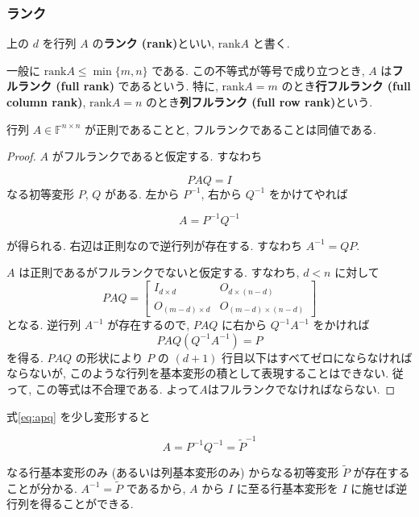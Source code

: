 \documentclass[a4paper]{scrbook}
\theoremstyle{definition}
\let\BeginKnitrBlock\begin \let\EndKnitrBlock\end
\begin{document}
\subsubsection*{ランク}

上の \(d\) を行列 \(A\) の\textbf{ランク (rank)}といい,
\(\mathrm{rank}A\) と書く.

一般に \(\mathrm{rank}A\le\min\{m,n\}\) である.
この不等式が等号で成り立つとき, \(A\) は\textbf{フルランク (full rank)}
であるという. 特に, \(\mathrm{rank}A=m\) のとき\textbf{行フルランク
(full column rank)}, \(\mathrm{rank}A=n\) のとき\textbf{列フルランク
(full row rank)}という.

\BeginKnitrBlock{proposition}
\protect\hypertarget{prp:unnamed-chunk-50}{}{\label{prp:unnamed-chunk-50}}行列
\(A\in\mathbb{F}^{n\times n}\) が正則であることと,
フルランクであることは同値である.
\EndKnitrBlock{proposition}

\BeginKnitrBlock{proof}
\iffalse {証明. } \fi \(A\) がフルランクであると仮定する. すなわち

\[
  PAQ=I
\] なる初等変形 \(P\), \(Q\) がある. 左から \(P^{-1}\), 右から
\(Q^{-1}\) をかけてやれば

\begin{equation}
  A = P^{-1}Q^{-1} \label{eq:apq}
\end{equation}

が得られる. 右辺は正則なので逆行列が存在する. すなわち \(A^{-1}=QP\).

\(A\) は正則であるがフルランクでないと仮定する. すなわち, \(d<n\)
に対して \[
  PAQ=\left[\begin{array}{c|c}
  I_{d\times d} & O_{d\times(n-d)}\\
  \hline O_{(m-d)\times d} & O_{(m-d)\times(n-d)}
  \end{array}\right]
\] となる. 逆行列 \(A^{-1}\) が存在するので, \(PAQ\) に右から
\(Q^{-1}A^{-1}\) をかければ \[ 
PAQ(Q^{-1}A^{-1})=P
\] を得る. \(PAQ\) の形状により \(P\) の \((d+1)\)
行目以下はすべてゼロにならなければならないが,
このような行列を基本変形の積として表現することはできない. 従って,
この等式は不合理である. よって\(A\)はフルランクでなければならない.
\EndKnitrBlock{proof}

式\eqref{eq:apq} を少し変形すると

\[
A=P^{-1}Q^{-1}=\tilde{P}^{-1}
\]

なる行基本変形のみ (あるいは列基本変形のみ) からなる初等変形
\(\tilde{P}\) が存在することが分かる. \(A^{-1}=\tilde{P}\) であるから,
\(A\) から \(I\) に至る行基本変形を \(I\)
に施せば逆行列を得ることができる.
\end{document}
